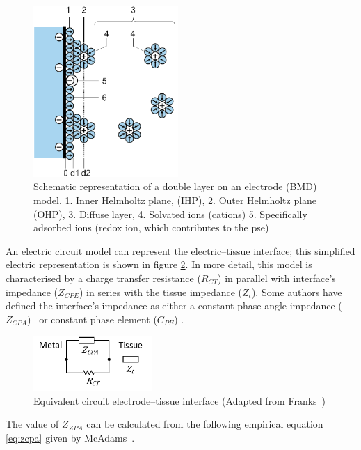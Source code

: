 \begin{figure}[!htpb]
	\centering
	\includegraphics[width=5.5cm,keepaspectratio]{figure7}    
	\caption[Dual layer representation on an elecgtrode]{Schematic representation of a double layer on an electrode (BMD) model. 1. Inner Helmholtz plane, (IHP), 2. Outer Helmholtz plane (OHP), 3. Diffuse layer, 4. Solvated ions (cations) 5. Specifically adsorbed ions (redox ion, which contributes to the pse)}
	\label{fig:DLC}
\end{figure}


An electric circuit model can represent the electric–tissue interface; this simplified electric representation is shown in figure \ref{fig:e-t circuit}. In more detail, this model is characterised by a charge transfer resistance ($R_{CT}$) in parallel with interface’s impedance ($Z_{CPE}$) in series with the tissue impedance ($Z_t$).  Some authors have defined the interface’s impedance as either a constant phase angle impedance ($Z_{CPA}$)~\cite{franks2005impedance} or constant phase element ($C_{PE}$) \cite{barsoukov2005impedance,mcadams2006characterization}. 

\begin{figure}[!htpb]
	\centering
	\includegraphics[width=4.5cm,keepaspectratio]{figure8}    
	\caption[Equivalent circuit electrode–tissue interface]{Equivalent circuit electrode–tissue interface (Adapted from Franks~\cite{franks2005impedance})}
	\label{fig:e-t circuit}
\end{figure}

The value of $Z_{ZPA}$ can be calculated from the following empirical equation \ref{eq:zcpa} given by McAdams~\cite{mcadams1995linear}.

